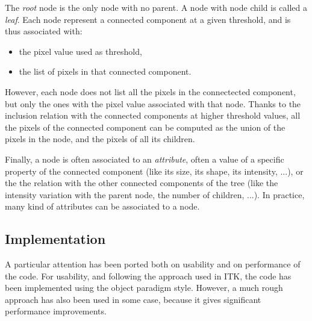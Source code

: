 \documentclass{InsightArticle}
\begin{document}
The {\em root} node is the only node with no parent. A node with node child is called a {\em leaf}.
Each node represent a connected component at a given threshold, and is thus associated with:
\begin{itemize}
  \item the pixel value used as threshold,
  \item the list of pixels in that connected component.
\end{itemize}

However, each node does not list all the pixels in the connectected component, but only the ones with the pixel value associated with that node. Thanks to the inclusion relation with the connected components at higher threshold values, all the pixels of the connected component can be computed as the union of the pixels in the node, and the pixels of all its children.

Finally, a node is often associated to an {\em attribute}, often a value of a specific property of the connected component (like its size, its shape, its intensity, ...), or the the relation with the other connected components of the tree (like the intensity variation with the parent node, the number of children, ...). In practice, many kind of attributes can be associated to a node.

  \subsection{Implementation}

A particular attention has been ported both on usability and on performance of the code.
For usability, and following the approach used in ITK, the code has been implemented using the object paradigm style. However, a much rough approach has also been used in some case, because it gives significant performance improvements.
\end{document}
